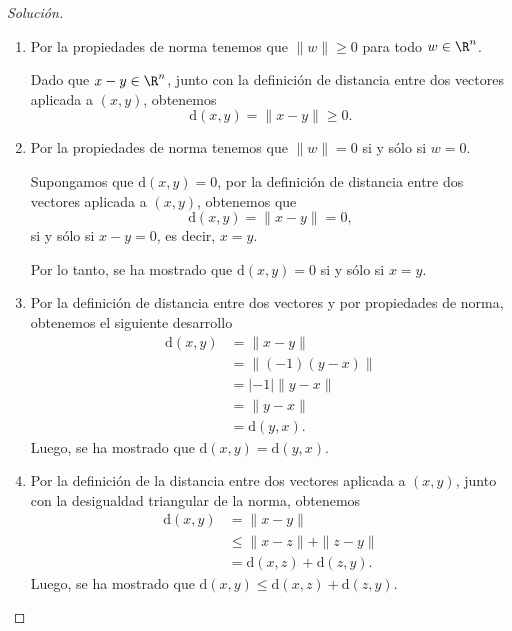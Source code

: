 \documentclass[a4,11pt]{aleph-notas}
\begin{document}
\begin{proof}[Solución]\hspace{0pt}
    \begin{enumerate}
        \item 
        Por la propiedades de norma tenemos que $\|w\|\geq0$ para todo $w\in\R^n$.
        
        Dado que $x-y\in\R^n$, junto con la definición de distancia entre dos vectores aplicada a $(x,y)$, obtenemos
        \[
            \text{d}(x,y) = \|x - y\| \geq 0.
        \]
        \item
        Por la propiedades de norma tenemos que $\|w\| = 0$ si y sólo si $w=0$.
        
        Supongamos que $\text{d}(x,y)=0$, por la definición de distancia entre dos vectores aplicada a $(x,y)$, obtenemos que 
        \[
            \text{d}(x,y) = \|x - y\| = 0,
        \]
        si y sólo si $x - y = 0$, es decir, $x=y$.
        
        Por lo tanto, se ha mostrado que $\text{d}(x,y) = 0$ si y sólo si $x=y$.
        \item
        Por la definición de distancia entre dos vectores y por propiedades de norma, obtenemos el siguiente desarrollo
        \begin{align*}
            \text{d}(x,y) &= \|x-y\|\\
                          &= \|(-1)(y-x)\|\\
                          &= |-1|\|y-x\|\\
                          &= \|y-x\|\\
                          &= \text{d}(y,x).
        \end{align*}
        Luego, se ha mostrado que $\text{d}(x,y) =\text{d}(y,x)$.
        \item 
        Por la definición de la distancia entre dos vectores aplicada a $(x,y)$, junto con la desigualdad triangular de la norma, obtenemos
        \begin{align*}
            \text{d}(x, y) &= \|x-y\|\\
                           &\leq \|x-z\| + \|z-y\|\\
                           &= \text{d}(x, z) + \text{d}(z,y).
        \end{align*}
        Luego, se ha mostrado que $\text{d}(x, y) \leq \text{d}(x, z) + \text{d}(z,y)$.
    \end{enumerate}
\end{proof}
    
\end{document}
